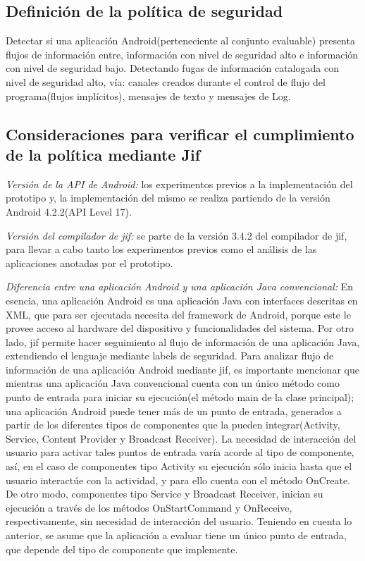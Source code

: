\subsection{Definición de la política de seguridad}
Detectar si una aplicación Android(perteneciente al conjunto evaluable) presenta
flujos de información entre, información con nivel de seguridad alto e
información con nivel de seguridad bajo.\newline 
Detectando fugas de información catalogada con nivel de seguridad alto, vía:
canales creados durante el control de flujo del programa(flujos implícitos),
mensajes de texto y mensajes de Log.\newline 

\subsection{Consideraciones para verificar el cumplimiento de la política
mediante Jif} 
\textit{Versión de la API de Android:}\newline
los experimentos previos a la implementación del prototipo y, la implementación
del mismo se realiza partiendo de la versión Android 4.2.2(API Level 17).

\textit{Versión del compilador de jif:}\newline
se parte de la versión 3.4.2 del compilador de jif, para llevar a cabo tanto los
experimentos previos como el análisis de las aplicaciones anotadas por el
prototipo.

\textit{Diferencia entre una aplicación Android y una aplicación Java
convencional:}\newline 
En esencia, una aplicación Android es una aplicación Java con interfaces
descritas en XML, que para ser ejecutada necesita del framework de Android,
porque este le provee acceso al hardware del dispositivo y funcionalidades del
sistema.\newline 
Por otro lado, jif permite hacer seguimiento al flujo de información de una
aplicación Java, extendiendo el lenguaje mediante labels de seguridad.\newline
Para analizar flujo de información de una aplicación Android mediante
jif, es importante mencionar que mientras una aplicación Java convencional
cuenta con un único método como punto de entrada para iniciar su ejecución(el
método main de la clase principal); una aplicación Android puede tener más de un
punto de entrada, generados a partir de los diferentes tipos de componentes que
la pueden integrar(Activity, Service, Content Provider y Broadcast
Receiver). La necesidad de interacción del usuario para activar tales puntos de
entrada varía acorde al tipo de componente, así, en el caso de componentes tipo
Activity su ejecución sólo inicia hasta que el usuario interactúe con la
actividad, y para ello cuenta con el método OnCreate. De otro modo, componentes
tipo Service y Broadcast Receiver, inician su ejecución a través de los métodos
OnStartCommand y OnReceive, respectivamente, sin necesidad de interacción del
usuario.\newline 
{ \color{black} {Teniendo en cuenta lo anterior, se asume que la aplicación a
evaluar tiene un único punto de entrada, que depende del tipo de componente que
implemente.} }

